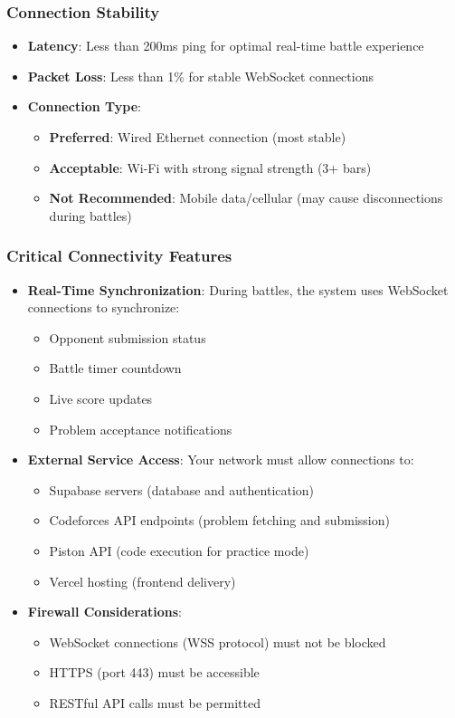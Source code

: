 \documentclass[12pt]{article}
\begin{document}
\subsubsection{Connection Stability}

\begin{itemize}
\item \textbf{Latency}: Less than 200ms ping for optimal real-time battle experience
\item \textbf{Packet Loss}: Less than 1\% for stable WebSocket connections
\item \textbf{Connection Type}:
  \begin{itemize}
    \item \textbf{Preferred}: Wired Ethernet connection (most stable)
    \item \textbf{Acceptable}: Wi-Fi with strong signal strength (3+ bars)
    \item \textbf{Not Recommended}: Mobile data/cellular (may cause disconnections during battles)
  \end{itemize}
\end{itemize}

\subsubsection{Critical Connectivity Features}

\begin{itemize}
\item \textbf{Real-Time Synchronization}: During battles, the system uses WebSocket connections to synchronize:
  \begin{itemize}
    \item Opponent submission status
    \item Battle timer countdown
    \item Live score updates
    \item Problem acceptance notifications
  \end{itemize}
  \clearpage
\item \textbf{External Service Access}: Your network must allow connections to:
  \begin{itemize}
    \item Supabase servers (database and authentication)
    \item Codeforces API endpoints (problem fetching and submission)
    \item Piston API (code execution for practice mode)
    \item Vercel hosting (frontend delivery)
  \end{itemize}
\item \textbf{Firewall Considerations}:
  \begin{itemize}
    \item WebSocket connections (WSS protocol) must not be blocked
    \item HTTPS (port 443) must be accessible
    \item RESTful API calls must be permitted
  \end{itemize}
\end{itemize}
\end{document}
